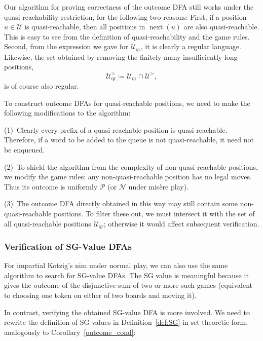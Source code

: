 \documentclass[11pt]{article}
\theoremstyle{definition}
\theoremstyle{plain}
\newcommand{\varP}{\mathcal{P}}
\newcommand{\varN}{\mathcal{N}}
\newcommand{\varU}{\mathcal{U}}
\newcommand{\nxt}{\operatorname{next}}
\begin{document}
Our algorithm for proving correctness of the outcome DFA still works under the quasi-reachability restriction, for the following two reasons:
First, if a position $u\in\varU$ is quasi-reachable, then all positions in $\nxt(u)$ are also quasi-reachable. This is easy to see from the definition of quasi-reachability and the game rules.
Second, from the expression we gave for $\varU_{\mathrm{qr}}$, it is clearly a regular language.
Likewise, the set obtained by removing the finitely many insufficiently long positions,
\[
    \varU_{\mathrm{qr}}^> \coloneq \varU_{\mathrm{qr}} \cap \varU^>,
\]
is of course also regular.

To construct outcome DFAs for quasi-reachable positions, we need to make the following modifications to the algorithm:

(1)~Clearly every prefix of a quasi-reachable position is quasi-reachable. Therefore, if a word to be added to the queue is not quasi-reachable, it need not be enqueued.

(2)~To shield the algorithm from the complexity of non-quasi-reachable positions, we modify the game rules: any non-quasi-reachable position has no legal moves.
Thus its outcome is uniformly $\varP$ (or $\varN$ under misère play).

(3)~The outcome DFA directly obtained in this way may still contain some non-quasi-reachable positions.
To filter these out, we must intersect it with the set of all quasi-reachable positions $\varU_{\mathrm{qr}}$; otherwise it would affect subsequent verification.

\subsubsection{Verification of SG-Value DFAs}

For impartial Kotzig's nim under normal play, we can also use the same algorithm to search for SG-value DFAs.
The SG value is meaningful because it gives the outcome of the disjunctive sum of two or more such games (equivalent to choosing one token on either of two boards and moving it).

In contrast, verifying the obtained SG-value DFA is more involved.
We need to rewrite the definition of SG values in Definition~\ref{def:SG} in set-theoretic form, analogously to Corollary~\ref{outcome_cond}:
\end{document}
